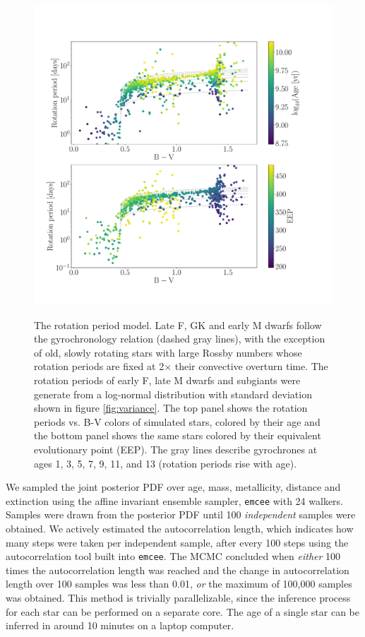 \begin{figure}
  \caption{
The rotation period model.
Late F, GK and early M dwarfs follow the \citet{angus2015} gyrochronology
    relation (dashed gray lines), with the exception of old, slowly
    rotating stars with large Rossby numbers whose rotation periods are fixed
    at 2$\times$ their convective overturn time.
The rotation periods of early F, late M dwarfs and subgiants were generate
    from a log-normal distribution with standard deviation shown in figure
    \ref{fig:variance}.
The top panel shows the rotation periods vs. B-V colors of simulated stars,
    colored by their age and the bottom panel shows the same stars colored
    by their equivalent evolutionary point (EEP).
    The gray lines describe \citep{angus2015} gyrochrones at ages 1, 3, 5, 7,
    9, 11, and 13 (rotation periods rise with age).
}
  \centering
    \includegraphics[width=1.\textwidth]{rotation_model}
\label{fig:rotation_model}
\end{figure}

We sampled the joint posterior PDF over age, mass, metallicity, distance and
extinction using the affine invariant ensemble sampler, {\tt emcee}
\citep{foreman-mackey2013} with 24 walkers.
Samples were drawn from the posterior PDF until 100 {\it independent} samples
were obtained.
We actively estimated the autocorrelation length, which indicates how many
steps were taken per independent sample, after every 100 steps using the
autocorrelation tool built into {\tt emcee}.
The MCMC concluded when {\it either} 100 times the autocorrelation length was
reached and the change in autocorrelation length over 100 samples was less
than 0.01, {\it or} the maximum of 100,000 samples was obtained.
This method is trivially parallelizable, since the inference process for each
star can be performed on a separate core.
The age of a single star can be inferred in around 10 minutes on a laptop
computer.

